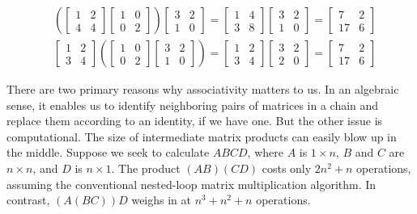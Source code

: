 \documentclass[10pt]{article}
\begin{document}
\[
\begin{aligned}
&\left(\begin{bmatrix}
1 & 2 \\
4 & 4
\end{bmatrix}
\begin{bmatrix}
1 & 0 \\
0 & 2
\end{bmatrix}
\right)
\begin{bmatrix}
3 & 2 \\
1 & 0
\end{bmatrix}
=
\begin{bmatrix}
1 & 4 \\
3 & 8
\end{bmatrix}
\begin{bmatrix}
3 & 2 \\
1 & 0
\end{bmatrix}
=\begin{bmatrix}
7 & 2 \\
17 & 6
\end{bmatrix}\\
&\begin{bmatrix}
1 & 2 \\
3 & 4
\end{bmatrix}
\left(\begin{bmatrix}
1 & 0 \\
0 & 2
\end{bmatrix}
\begin{bmatrix}
3 & 2 \\
1 & 0
\end{bmatrix}
\right)
=\begin{bmatrix}
1 & 2 \\
3 & 4
\end{bmatrix}
\begin{bmatrix}
3 & 2 \\
2 & 0
\end{bmatrix}
=\begin{bmatrix}
7 & 2 \\
17 & 6
\end{bmatrix}
\end{aligned}
\]

There are two primary reasons why associativity matters to us. In an algebraic sense, it enables us to identify neighboring pairs of matrices in a chain and replace them according to an identity, if we have one. But the other issue is computational. The size of intermediate matrix products can easily blow up in the middle. Suppose we seek to calculate $ABCD$, where $A$ is $1 \times n$, $B$ and $C$ are $n \times n$, and $D$ is $n \times 1$. The product $(AB)(CD)$ costs only $2n^2+n$ operations, assuming the conventional nested-loop matrix multiplication algorithm. In contrast, $(A(BC))D$ weighs in at $n^3+n^2+n$ operations.
\end{document}
